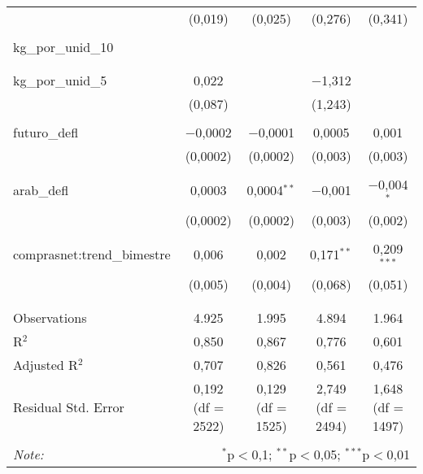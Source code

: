 \begin{table}[!htbp]
\begin{tabular}{@{\extracolsep{5pt}}lcccc}
  & (0,019) & (0,025) & (0,276) & (0,341) \\ 
  & & & & \\ 
 kg\_por\_unid\_10 &  &  &  &  \\ 
  &  &  &  &  \\ 
  & & & & \\ 
 kg\_por\_unid\_5 & 0,022 &  & $-$1,312 &  \\ 
  & (0,087) &  & (1,243) &  \\ 
  & & & & \\ 
 futuro\_defl & $-$0,0002 & $-$0,0001 & 0,0005 & 0,001 \\ 
  & (0,0002) & (0,0002) & (0,003) & (0,003) \\ 
  & & & & \\ 
 arab\_defl & 0,0003 & 0,0004$^{**}$ & $-$0,001 & $-$0,004$^{*}$ \\ 
  & (0,0002) & (0,0002) & (0,003) & (0,002) \\ 
  & & & & \\ 
 comprasnet:trend\_bimestre & 0,006 & 0,002 & 0,171$^{**}$ & 0,209$^{***}$ \\ 
  & (0,005) & (0,004) & (0,068) & (0,051) \\ 
  & & & & \\ 
\hline \\[-1.8ex] 
Observations & 4.925 & 1.995 & 4.894 & 1.964 \\ 
R$^{2}$ & 0,850 & 0,867 & 0,776 & 0,601 \\ 
Adjusted R$^{2}$ & 0,707 & 0,826 & 0,561 & 0,476 \\ 
Residual Std. Error & 0,192 (df = 2522) & 0,129 (df = 1525) & 2,749 (df = 2494) & 1,648 (df = 1497) \\ 
\hline 
\hline \\[-1.8ex] 
\textit{Note:}  & \multicolumn{4}{r}{$^{*}$p$<$0,1; $^{**}$p$<$0,05; $^{***}$p$<$0,01} \\ 
\end{tabular} 
\end{table} 
